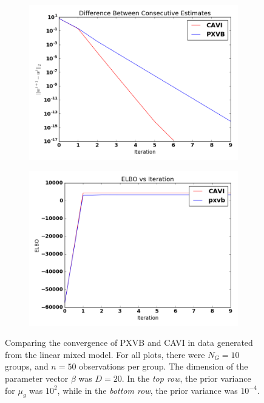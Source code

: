 \documentclass{article}
\begin{document}
\begin{figure}[tb]
\begin{subfigure}[t]{0.49\textwidth}
        \subcaption{}
    \end{subfigure}
    \begin{subfigure}[t]{0.49\textwidth}
        \includegraphics[width=\textwidth]{LMM/pw_lmm_smallvar.png}
        \subcaption{}
    \end{subfigure}
          \begin{subfigure}[t]{0.49\textwidth}
        \includegraphics[width=\textwidth]{LMM/elbo_lmm_smallvar.png}
            \subcaption{}
    \end{subfigure}
    \caption{Comparing the convergence of PXVB and CAVI in data generated from the linear mixed model. For all plots, there were $N_G = 10$ groups, and $n = 50$ observations per group. The dimension of the parameter vector $\beta$ was $D = 20$. In the {\itshape top row}, the prior variance for $\mu_g$ was $10^{2}$, while in the {\itshape bottom row}, the prior variance was $10^{-4}$. } %
    \label{fig:lmm}
\end{figure}
\end{document}
